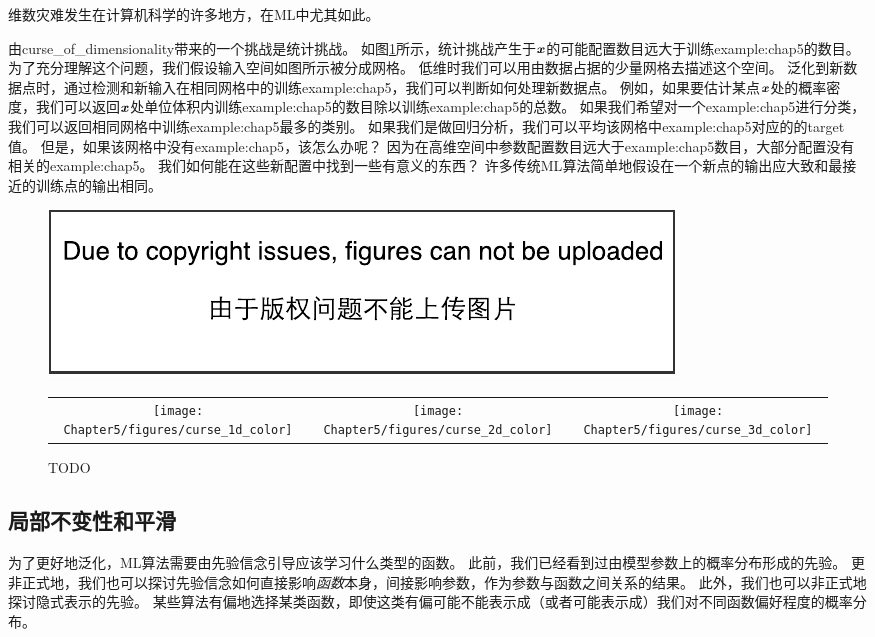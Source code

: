 维数灾难发生在计算机科学的许多地方，在\gls{ML}中尤其如此。

由\gls{curse_of_dimensionality}带来的一个挑战是统计挑战。
如图\ref{fig:chap5_curse}所示，统计挑战产生于$\boldsymbol{\mathit{x}}$的可能配置数目远大于训练\gls{example:chap5}的数目。
为了充分理解这个问题，我们假设输入空间如图所示被分成网格。
低维时我们可以用由数据占据的少量网格去描述这个空间。
泛化到新数据点时，通过检测和新输入在相同网格中的训练\gls{example:chap5}，我们可以判断如何处理新数据点。
例如，如果要估计某点$\boldsymbol{\mathit{x}}$处的概率密度，我们可以返回$\boldsymbol{\mathit{x}}$处单位体积内训练\gls{example:chap5}的数目除以训练\gls{example:chap5}的总数。
如果我们希望对一个\gls{example:chap5}进行分类，我们可以返回相同网格中训练\gls{example:chap5}最多的类别。
如果我们是做回归分析，我们可以平均该网格中\gls{example:chap5}对应的的\gls{target}值。
但是，如果该网格中没有\gls{example:chap5}，该怎么办呢？
因为在高维空间中参数配置数目远大于\gls{example:chap5}数目，大部分配置没有相关的\gls{example:chap5}。
我们如何能在这些新配置中找到一些有意义的东西？
许多传统\gls{ML}算法简单地假设在一个新点的输出应大致和最接近的训练点的输出相同。


\begin{figure}[!htb]
\ifOpenSource
\centerline{\includegraphics{figure.pdf}}
\else
\begin{tabular}{ccc}
    \texttt{[image: Chapter5/figures/curse\_1d\_color]} & \texttt{[image: Chapter5/figures/curse\_2d\_color]} & \texttt{[image: Chapter5/figures/curse\_3d\_color]}
\end{tabular}
\fi
\caption{TODO}
\label{fig:chap5_curse}
\end{figure}


\subsection{局部不变性和平滑}
\label{sec:local_constancy_and_smoothness_regularization}
为了更好地泛化，\gls{ML}算法需要由先验信念引导应该学习什么类型的函数。
此前，我们已经看到过由模型参数上的概率分布形成的先验。
更非正式地，我们也可以探讨先验信念如何直接影响\emph{函数}本身，间接影响参数，作为参数与函数之间关系的结果。 
此外，我们也可以非正式地探讨隐式表示的先验。
某些算法有偏地选择某类函数，即使这类有偏可能不能表示成（或者可能表示成）我们对不同函数偏好程度的概率分布。

